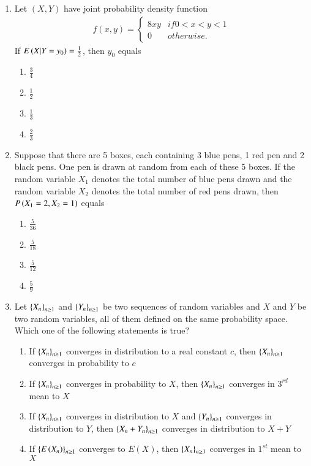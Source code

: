 \documentclass[journal]{IEEEtran}
\begin{document}
\begin{enumerate}
\item Let $ (X,Y) $ have joint probability density function
\begin{align*}
    f(x, y) = \begin{cases} 
      8xy & if 0 < x < y < 1 \\ 
      0 & otherwise. 
   \end{cases}
\end{align*}
If $ E\left(X\middle|Y = y_0\right)= \frac{1}{2} $, then $ y_0 $ equals
\begin{enumerate}
    \item $ \frac{3}{4} $
    \item $ \frac{1}{2} $
    \item $ \frac{1}{3} $
    \item $ \frac{2}{3} $
\end{enumerate}

\item Suppose that there are 5 boxes, each containing 3 blue pens, 1 red pen and 2 black pens. One pen is drawn at random from each of these 5 boxes. If the random variable $ X_1$ denotes the total number of blue pens drawn and the random variable $ X_2 $ denotes the total number of red pens drawn, then $ P\left(X_1 = 2, X_2 = 1\right) $ equals
\begin{enumerate}
    \item $ \frac{5}{36} $
    \item $ \frac{5}{18} $
    \item $ \frac{5}{12} $
    \item $ \frac{5}{9} $
\end{enumerate}

\item Let $ \left\{X_n\right\}_{n \geq 1} $ and $ \left\{Y_n\right\}_{n \geq 1} $ be two sequences of random variables and $ X $ and $ Y $ be two random variables, all of them defined on the same probability space. Which one of the following statements is true?
\begin{enumerate}
    \item If $\left\{X_n\right\}_{n \geq 1}$ converges in distribution to a real constant $ c $, then $ \left\{X_n\right\}_{n \geq 1} $ converges in probability to $ c $
    \item If $ \left\{X_n\right\}_{n \geq 1} $ converges in probability to $ X $, then $ \left\{X_n\right\}_{n \geq 1} $ converges in $3^{rd}$ mean to $ X $
    \item If $ \left\{X_n\right\}_{n \geq 1} $ converges in distribution to $ X $ and $ \left\{Y_n\right\}_{n \geq 1} $ converges in distribution to $ Y $, then $ \left\{X_n + Y_n\right\}_{n \geq 1} $ converges in distribution to $ X + Y $
    \item If $\left\{E\left(X_n\right)\right\}_{n \geq 1}$ converges to $E(X) $, then $ \left\{X_n\right\}_{n \geq 1}$ converges in $1^{st}$ mean to $ X $
\end{enumerate}


\end{enumerate}
\end{document}
